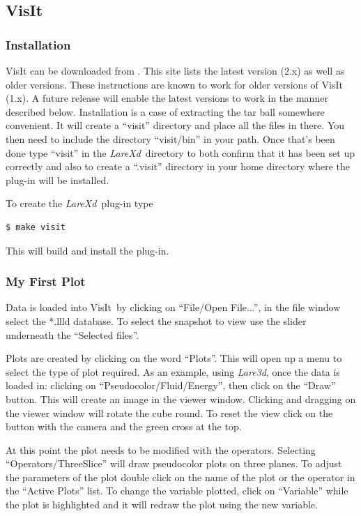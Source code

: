 \documentclass[11pt]{article}
\newcommand{\lare}{{\it LareXd}\ }
\newcommand{\visit}{VisIt\ }
\begin{document}
\subsection{VisIt}
\subsubsection{Installation}
VisIt can be downloaded from \cite{visit}. This site lists the latest version (2.x) as well as older versions. These instructions are known to work for older versions of VisIt (1.x). A future release will enable the latest versions to work in the manner described below. Installation is a case of extracting the tar ball somewhere convenient. It will create a ``visit'' directory and place all the files in there. You then need to include the directory ``visit/bin'' in your path. Once that's been done type ``visit'' in the \lare directory to both confirm that it has been set up correctly and also to create a ``.visit'' directory in your home directory where the plug-in will be installed.

To create the \lare plug-in type
\begin{verbatim}
$ make visit
\end{verbatim}

This will build and install the plug-in.

\subsubsection{My First Plot}
Data is loaded into \visit by clicking on ``File/Open File...'', in the file window select the *.llld database. To select the snapshot to view use the slider underneath the ``Selected files''. 

Plots are created by clicking on the word ``Plots''. This will open up a menu to select the type of plot required. As an example, using {\it Lare3d}, once the data is loaded in: clicking on ``Pseudocolor/Fluid/Energy'', then click on the ``Draw'' button. This will create an image in the viewer window. Clicking and dragging on the viewer window will rotate the cube round. To reset the view click on the button  with the camera and the green cross at the top. 

At this point the plot needs to be modified with the operators. Selecting ``Operators/ThreeSlice'' will draw pseudocolor plots on three planes. To adjust the parameters of the plot double click on the name of the plot or the operator in the ``Active Plots'' list. To change the variable plotted, click on ``Variable'' while the plot is highlighted and it will redraw the plot using the new variable.
\end{document}
